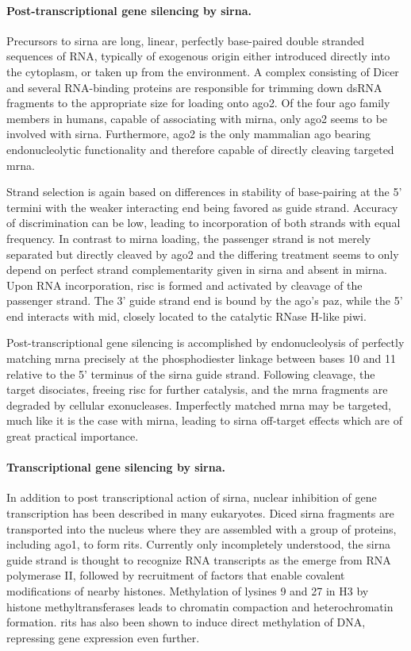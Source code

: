 \paragraph{Post-transcriptional gene silencing by \gls{sirna}.}
Precursors to \gls{sirna} are long, linear, perfectly base-paired double stranded sequences of RNA, typically of exogenous origin either introduced directly into the cytoplasm, or taken up from the environment. A complex consisting of Dicer and several RNA-binding proteins are responsible for trimming down dsRNA fragments to the appropriate size for loading onto \gls{ago}2. Of the four \glsdesc{ago} family members in humans, capable of associating with \gls{mirna}, only \gls{ago}2 seems to be involved with \gls{sirna}. Furthermore, \gls{ago}2 is the only mammalian \glsdesc{ago} bearing endonucleolytic functionality and therefore capable of directly cleaving targeted \gls{mrna}.

Strand selection is again based on differences in stability of base-pairing at the 5' termini with the weaker interacting end being favored as guide strand. Accuracy of discrimination can be low, leading to incorporation of both strands with equal frequency. In contrast to \gls{mirna} loading, the passenger strand is not merely separated but directly cleaved by \gls{ago}2 and the differing treatment seems to only depend on perfect strand complementarity given in \gls{sirna} and absent in \gls{mirna}. Upon RNA incorporation, \gls{risc} is formed and activated by cleavage of the passenger strand. The 3' guide strand end is bound by the \glsdesc{ago}'s \gls{paz}, while the 5' end interacts with \gls{mid}, closely located to the catalytic RNase H-like \gls{piwi}.

Post-transcriptional gene silencing is accomplished by endonucleolysis of perfectly matching \gls{mrna} precisely at the phosphodiester linkage between bases 10 and 11 relative to the 5' terminus of the \gls{sirna} guide strand. Following cleavage, the target disociates, freeing \gls{risc} for further catalysis, and the \gls{mrna} fragments are degraded by cellular exonucleases. Imperfectly matched \gls{mrna} may be targeted, much like it is the case with \gls{mirna}, leading to \gls{sirna} off-target effects which are of great practical importance.

\paragraph{Transcriptional gene silencing by \gls{sirna}.}
In addition to post transcriptional action of \gls{sirna}, nuclear inhibition of gene transcription has been described in many eukaryotes. Diced \gls{sirna} fragments are transported into the nucleus where they are assembled with a group of proteins, including \gls{ago}1, to form \gls{rits}. Currently only incompletely understood, the \gls{sirna} guide strand is thought to recognize RNA transcripts as the emerge from RNA polymerase II, followed by recruitment of factors that enable covalent modifications of nearby histones. Methylation of lysines 9 and 27 in H3 by histone methyltransferases leads to chromatin compaction and heterochromatin formation. \Gls{rits} has also been shown to induce direct methylation of DNA, repressing gene expression even further.

